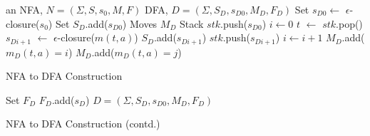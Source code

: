 \documentclass[8pt,a4paper,compress]{beamer}
\begin{document}
\begin{frame}[fragile]
\pause

\begin{algorithm}[H]
\begin{algorithmic}
\REQUIRE an NFA, $N = (\Sigma, S, s_0, M, F)$
\ENSURE DFA, $D = (\Sigma, S_D, s_{D0}, M_D, F_D)$
\STATE Set $s_{D0} \gets$  $\epsilon$-closure($s_0$)
\STATE Set $S_D$.add($s_{D0}$)
\STATE Moves $M_D$
\STATE Stack $stk$.push($s_{D0}$)
\STATE $i \gets 0$
\STATE $t$ $\gets$ $stk$.pop()
\STATE $s_{Di+1}$ $\gets$ $\epsilon$-closure($m(t, a)$)
\STATE $S_D$.add($s_{Di+1}$) 
\STATE $stk$.push($s_{Di+1}$)
\STATE $i \gets i + 1$
\STATE $M_D$.add($m_D(t,a) = i$)
\STATE $M_D$.add($m_D(t, a) = j$) 
\ENDIF
\ENDIF
\ENDFOR
\ENDWHILE
\end{algorithmic}
\caption{NFA to DFA Construction}
\end{algorithm}
\end{frame}

\begin{frame}[fragile]
\pause

\begin{algorithm}[H]
\begin{algorithmic}
\STATE Set $F_D$
\STATE $F_D$.add($s_D$)
\ENDIF
\ENDFOR
\ENDFOR
\RETURN $D = (\Sigma, S_D, s_{D0}, M_D, F_D)$
\end{algorithmic}
\caption{NFA to DFA Construction (contd.)}
\end{algorithm}
\end{frame}
\end{document}
